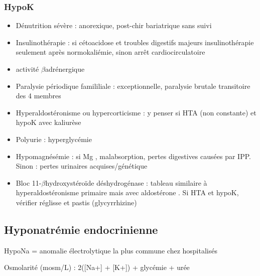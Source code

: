 \documentclass{book}
\begin{document}
\subsubsection{HypoK}
\label{sec:org61fb756}
\begin{itemize}
\item Dénutrition sévère : anorexique, post-chir bariatrique sans suivi
\item Insulinothérapie : si cétoacidose et troubles digestifs majeurs \thus
insulinothérapie seulement après normokaliémie, sinon arrêt cardiocirculatoire \faBomb
\item \inc activité \(\beta\)adrénergique
\item Paralysie périodique famililiale : exceptionnelle, paralysie brutale
transitoire des 4 membres
\item Hyperaldostéronisme ou hypercorticisme : y penser si HTA (non constante) et hypoK avec
kaliurèse \inc
\item Polyurie : hyperglycémie \inc
\item Hypomagnésémie : si Mg \dec, malabsorption, pertes digestives causées par
IPP. Sinon : pertes urinaires acquises/génétique
\item Bloc 11-\(\beta\)hydroxystéroïde déshydrogénase : tableau similaire à
hyperaldostéronisme primaire mais avec aldostérone \dec. Si HTA et hypoK,
vérifier réglisse et pastis (glycyrrhizine)
\end{itemize}

\subsection{Hyponatrémie endocrinienne}
\label{sec:org4d05417}

HypoNa = anomalie électrolytique la plus commune chez hospitalisés

Osmolarité (mosm/L) : 2\texttimes{}([Na+] + [K+]) + glycémie + urée
\end{document}
